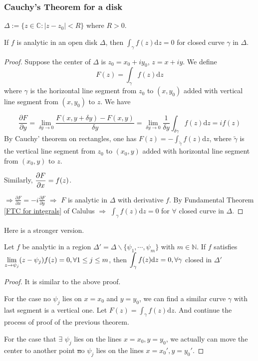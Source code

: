 \subsubsection{Cauchy's Theorem for a disk}
$ \Delta:=\{z\in \mathbb{C}:|z-z_0|<R\} $ where  $ R>0 $.
\begin{theorem}\label{Cauchy's theorem for a disk}
   If  $ f $ is analytic in an open disk  $ \Delta $, then  $ \int_\gamma f(z)\mathrm{d}z=0 $  for closed curve  $ \gamma $ in  $ \Delta $.  
\end{theorem}  
\begin{proof}
   Suppose the center of  $ \Delta $ is  $ z_0=x_0+iy_0 $,  $ z=x+iy $. We define 
   \[F(z)=\int_\gamma f(z)\mathrm{d}z\]
   where  $ \gamma $ is the horizontal line segment from  $ z_0 $ to  $ (x,y_0) $ added with vertical line segment from  $ (x,y_0) $ to  $ z $. We have
    
\begin{equation}
      \frac{\partial F}{\partial y}=\lim_{\delta y\to 0}\frac{F(x,y+\delta y)-F(x,y)}{\delta y}=\lim_{\delta y\to 0}\frac{1}{\delta y}\int_{\delta\gamma}f(z)\mathrm{d}z=if(z)
\end{equation}
   By Cauchy' theorem on rectangles, one has  $ F(z)=-\int_{\tilde{\gamma}}f(z)\mathrm{d}z $, where  $ \tilde{\gamma} $ is the vertical line segment from  $ z_0 $ to  $ (x_0,y) $ added with horizontal line segment from  $ (x_0,y) $ to  $ z $.
   
   Similarly,  $ \displaystyle\frac{\partial F}{\partial x}=f(z) $.
   
   $ \Rightarrow \frac{\partial F}{\partial x}=-i\frac{\partial F}{\partial y} $ $ \Rightarrow  $ $ F  $   is analytic in  $ \Delta $  with derivative  $ f $.
   By Fundamental Theorem \ref{FTC for integrals} of Calulus $ \Rightarrow  $  $ \int_\gamma f(z)\mathrm{d}z=0 $ for  $ \forall  $ closed curve in  $ \Delta $.    
\end{proof}
Here is a stronger version.
\begin{theorem}\label{stronger version of Cauchy's theorem for a disk}
    Let  $ f $ be analytic in a region  $ \Delta'=\Delta\backslash\{\psi_1,\cdots,\psi_m\} $ with  $ m\in \mathbb{N} $. If  $ f $ satisfies  $ \displaystyle\lim\limits_{z\to \psi_j}(z-\psi_j)f(z)=0,\forall 1\leq j\leq m $, then  $ \displaystyle\int_\gamma f(z)\mathrm{d}z=0,\forall \gamma $ closed in  $ \Delta'  $     
\end{theorem}
\begin{proof}
    It is similar to the above proof.
    
    For the case no  $ \psi_j $ lies on  $ x=x_0 $ and  $ y=y_0 $, we can find a similar curve $ \gamma $ with last segment is a vertical one. Let  $ F(z)=\int_\gamma f(z)\mathrm{d}z $. And continue the process of proof of the previous theorem.  
    
    For the case that  $ \exists $  $ \psi_j $ lies on the lines  $ x=x_0,y=y_0 $, we actually can move the center to another point \st no  $ \psi_j $ lies on the lines  $ x=x_0',y=y_0'$.   
\end{proof}
